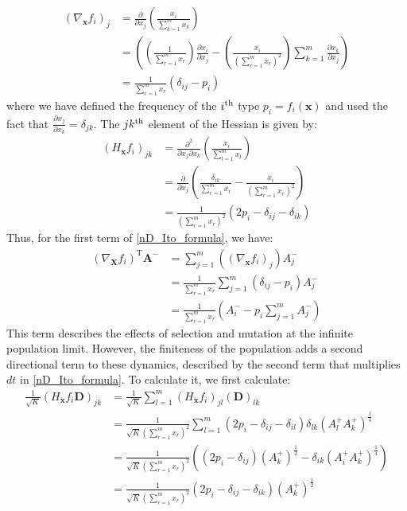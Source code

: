 \begin{align}
\left(\nabla_{\mathbf{x}} f_i\right)_j &= \frac{\partial }{\partial x_j}\left(\frac{x_i}{\sum\limits_{k=1}^{m}x_k}\right)\nonumber\\
&= \left(\left(\frac{1}{\sum\limits_{r=1}^{m}x_r}\right)\frac{\partial x_i}{\partial x_j} 
- \left(\frac{x_i}{\left(\sum\limits_{r=1}^{m}x_r\right)^2}\right)\sum\limits_{k=1}^{m}\frac{\partial x_k}{\partial x_j}\right)\nonumber\\
&= \frac{1}{\sum\limits_{r=1}^{m}x_r}\left(\delta_{ij}-p_i\right)\label{nD_jacobian_for_ito}
\end{align}
where we have defined the frequency of the $i\textsuperscript{th}$ type $p_i = f_i(\mathbf{x})$ and used the fact that $\frac{\partial x_j}{\partial x_k} = \delta_{jk}$.
The $jk\textsuperscript{th}$ element of the Hessian is given by:
\begin{align}
\left(H_{\mathbf{x}} f_i\right)_{jk} &= \frac{\partial^2 }{\partial x_j \partial x_k}\left( \frac{x_i}{\sum\limits_{l=1}^{m}x_l}\right)\nonumber\\
&= \frac{\partial}{\partial x_j}\left(\frac{\delta_{ik}}{\sum\limits_{r=1}^{m}x_r}-\frac{x_i}{\left(\sum\limits_{r=1}^{m}x_r\right)^2}\right)\nonumber\\
&= \frac{1}{\left(\sum\limits_{r=1}^{m}x_r\right)^2}\left(2p_i - \delta_{ij}-\delta_{ik}\right)\label{nD_hessian_for_ito}
\end{align}
Thus, for the first term of \eqref{nD_Ito_formula}, we have:
\begin{align}
\left(\nabla_{\mathbf{X}}f_i\right)^{\mathrm{T}}\boldsymbol{\mathbf{A}^{-}} &= \sum\limits_{j=1}^{m}\left(\left(\nabla_{\mathbf{x}} f_i\right)_j\right)A^{-}_{j} \nonumber\\
&= \frac{1}{\sum\limits_{r=1}^{m}x_r}\sum\limits_{j=1}^{m}\left(\delta_{ij}-p_i\right)A^{-}_{j}\nonumber\\
&= \frac{1}{\sum\limits_{r=1}^{m}x_r}\left(A^{-}_{i} - p_i\sum\limits_{j=1}^{m}A^{-}_{j}\right)\label{nD_for_Ito_first_term}
\end{align}
This term describes the effects of selection and mutation at the infinite population limit. However, the finiteness of the population adds a second directional term to these dynamics, described by the second term that multiplies $dt$ in \eqref{nD_Ito_formula}. To calculate it, we first calculate:
\begin{align}
\frac{1}{\sqrt{K}}\left(H_{\mathbf{x}} f_i \mathbf{D}\right)_{jk} &= \frac{1}{\sqrt{K}}\sum\limits_{l=1}^{m} \left(H_{\mathbf{x}} f_i \right)_{jl}\left(\mathbf{D}\right)_{lk}\nonumber\\
&= \frac{1}{\sqrt{K}\left(\sum\limits_{r=1}^{m}x_r\right)^2}\sum\limits_{l=1}^{m}\left(2p_i - \delta_{ij} - \delta_{il}\right)\delta_{lk}\left(A^{+}_{l}A^{+}_{k}\right)^{\frac{1}{4}}\\
&=  \frac{1}{\sqrt{K}\left(\sum\limits_{r=1}^{m}x_r\right)^2}\left(\left(2p_i -\delta_{ij}\right)(A^{+}_{k})^{\frac{1}{2}} -\delta_{ik}\left(A^{+}_{i}A^{+}_{k}\right)^{\frac{1}{4}}\right)\\
&= \frac{1}{\sqrt{K}\left(\sum\limits_{r=1}^{m}x_r\right)^2}\left(2p_i -\delta_{ij} -\delta_{ik}\right)(A^{+}_{k})^{\frac{1}{2}}
\end{align}
